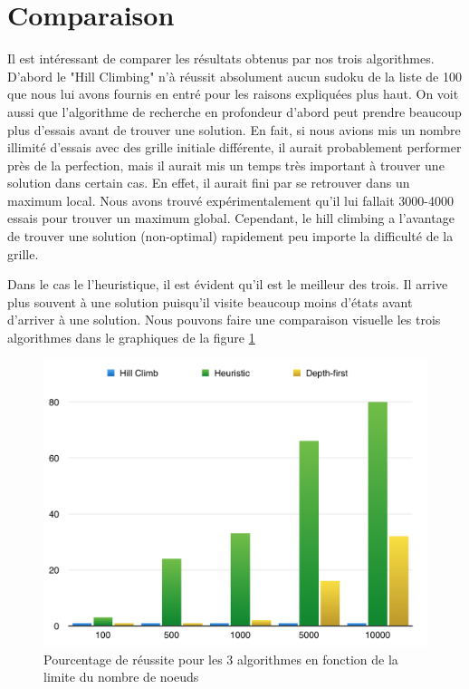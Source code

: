 \documentclass[a4paper,10pt]{article}
\begin{document}
\section{Comparaison}
Il est intéressant de comparer les résultats obtenus par nos trois algorithmes. D'abord le "Hill Climbing" n'à réussit absolument aucun sudoku de la liste de 100 que nous lui avons fournis en entré pour les raisons expliquées plus haut. On voit aussi que l'algorithme de recherche en profondeur d'abord peut prendre beaucoup plus d'essais avant de trouver une solution. En fait, si nous avions mis un nombre illimité d'essais avec des grille initiale différente, il aurait probablement performer près de la perfection, mais il aurait mis un temps très important à trouver une solution dans certain cas. En effet, il aurait fini par se retrouver dans un maximum local. Nous avons trouvé expérimentalement qu'il lui fallait 3000-4000 essais pour trouver un maximum global. Cependant, le hill climbing a l'avantage de trouver une solution (non-optimal) rapidement peu importe la difficulté de la grille.

Dans le cas le l'heuristique, il est évident qu'il est le meilleur des trois. Il arrive plus souvent à une solution puisqu'il visite beaucoup moins d'états avant d'arriver à une solution. Nous pouvons faire une comparaison visuelle les trois algorithmes dans le graphiques de la figure \ref{fig:comp} \\

\begin{figure}[H]
	\includegraphics[width=12cm]{images/comparaison.png} 
	\centering
	\caption{Pourcentage de réussite pour les 3 algorithmes en fonction de la limite du nombre de noeuds}
	\label{fig:comp}
\end{figure}
\end{document}
